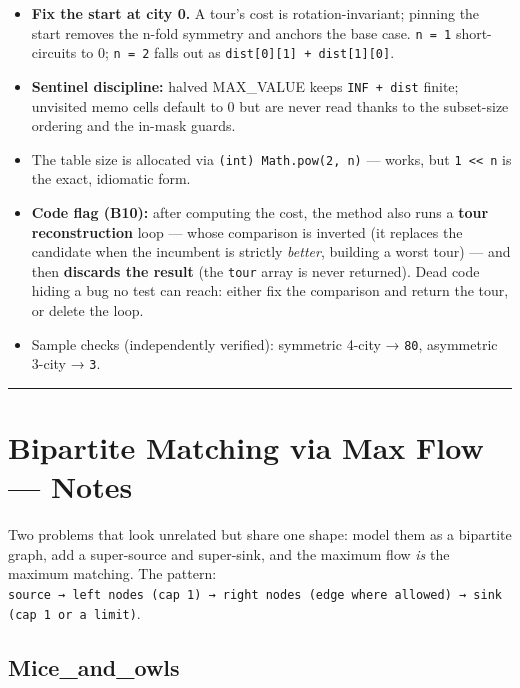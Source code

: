 \documentclass[
  10pt,
  letterpaper,
  onecolumn]{article}
\providecommand{\tightlist}{%
  \setlength{\itemsep}{0pt}\setlength{\parskip}{0pt}}
\begin{document}
\begin{itemize}
\tightlist
\item
  \textbf{Fix the start at city 0.} A tour's cost is rotation-invariant;
  pinning the start removes the n-fold symmetry and anchors the base
  case. \texttt{n\ =\ 1} short-circuits to 0; \texttt{n\ =\ 2} falls out
  as \texttt{dist{[}0{]}{[}1{]}\ +\ dist{[}1{]}{[}0{]}}.
\item
  \textbf{Sentinel discipline:} halved MAX\_VALUE keeps
  \texttt{INF\ +\ dist} finite; unvisited memo cells default to 0 but
  are never read thanks to the subset-size ordering and the in-mask
  guards.
\item
  The table size is allocated via \texttt{(int)\ Math.pow(2,\ n)} ---
  works, but \texttt{1\ \textless{}\textless{}\ n} is the exact,
  idiomatic form.
\item
  \textbf{Code flag (B10):} after computing the cost, the method also
  runs a \textbf{tour reconstruction} loop --- whose comparison is
  inverted (it replaces the candidate when the incumbent is strictly
  \emph{better}, building a worst tour) --- and then \textbf{discards
  the result} (the \texttt{tour} array is never returned). Dead code
  hiding a bug no test can reach: either fix the comparison and return
  the tour, or delete the loop.
\item
  Sample checks (independently verified): symmetric 4-city →
  \texttt{80}, asymmetric 3-city → \texttt{3}.
\end{itemize}

\begin{center}\rule{0.5\linewidth}{0.5pt}\end{center}

\hypertarget{bipartite-matching-via-max-flow-notes}{%
\section{Bipartite Matching via Max Flow ---
Notes}\label{bipartite-matching-via-max-flow-notes}}

Two problems that look unrelated but share one shape: model them as a
bipartite graph, add a super-source and super-sink, and the maximum flow
\emph{is} the maximum matching. The pattern:
\texttt{source\ →\ left\ nodes\ (cap\ 1)\ →\ right\ nodes\ (edge\ where\ allowed)\ →\ sink\ (cap\ 1\ or\ a\ limit)}.

\hypertarget{mice_and_owls}{%
\subsection{Mice\_and\_owls}\label{mice_and_owls}}
\end{document}

